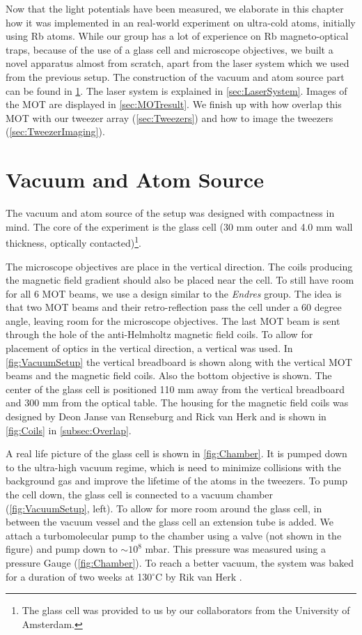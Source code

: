 Now that the light potentials have been measured, we elaborate in this chapter how it was implemented in an real-world experiment on ultra-cold atoms, initially using Rb atoms.
While our group has a lot of experience on Rb magneto-optical traps, because of the use of a glass cell and microscope objectives, we built a novel apparatus almost from scratch, apart from the laser system which we used from the previous setup.
The construction of the vacuum and atom source part can be found in \cref{sec:VacuumAtom}.
The laser system is explained in \cref{sec:LaserSystem}.
Images of the MOT are displayed in \cref{sec:MOTresult}.
We finish up with how overlap this MOT with our tweezer array (\cref{sec:Tweezers}) and how to image the tweezers (\cref{sec:TweezerImaging}).

\section{Vacuum and Atom Source}\label{sec:VacuumAtom}

The vacuum and atom source of the setup was designed with compactness in mind. 
The core of the experiment is the glass cell (30 mm outer and 4.0 mm wall thickness, optically contacted)\footnote{The glass cell was provided to us by our collaborators from the University of Amsterdam.}.

The microscope objectives are place in the vertical direction.
The coils producing the magnetic field gradient should also be placed near the cell. 
To still have room for all 6 MOT beams, we use a design similar to the \textit{Endres} group.
The idea is that two MOT beams and their retro-reflection pass the cell under a 60 degree angle, leaving room for the microscope objectives. 
The last MOT beam is sent through the hole of the anti-Helmholtz magnetic field coils.
To allow for placement of optics in the vertical direction, a vertical was used. 
In \cref{fig:VacuumSetup} the vertical breadboard is shown along with the vertical MOT beams and the magnetic field coils. 
Also the bottom objective is shown. 
The center of the glass cell is positioned 110 mm away from the vertical breadboard and 300 mm from the optical table. 
The housing for the magnetic field coils was designed by Deon Janse van Renseburg and Rick van Herk and is shown in \cref{fig:Coils} in \cref{subsec:Overlap}.

A real life picture of the glass cell is shown in \cref{fig:Chamber}.
It is pumped down to the ultra-high vacuum regime, which is need to minimize collisions with the background gas and improve the lifetime of the atoms in the tweezers.
To pump the cell down, the glass cell is connected to a vacuum chamber (\cref{fig:VacuumSetup}, left).
To allow for more room around the glass cell, in between the vacuum vessel and the glass cell an extension tube is added.
We attach a turbomolecular pump to the chamber using a valve (not shown in the figure) and pump down to $\sim 10^{8}$ mbar.
This pressure was measured using a pressure Gauge (\cref{fig:Chamber}).
To reach a better vacuum, the system was baked for a duration of two weeks at 130${}^{\circ}$C by Rik van Herk \cite{Herk2022}.

